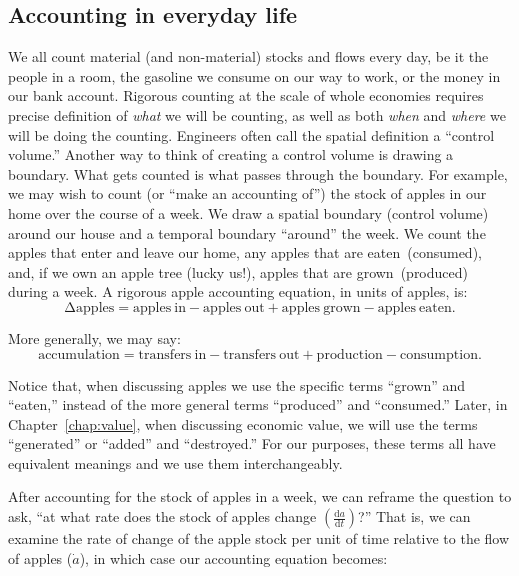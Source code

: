\subsection{Accounting in everyday life}
\label{sec:accounting_in_everyday_life}

We all count material (and non-material) stocks and flows every day,
be it the people in a room, the gasoline we consume on our way to work,
or the money in our bank account.
Rigorous counting at the scale of whole economies 
requires precise definition of
\emph{what} we will be counting,
as well as both \emph{when} and \emph{where} 
we will be doing the counting. 
Engineers often call the spatial definition a ``control volume.'' 
Another way to think of creating a
control volume is drawing a boundary. 
What gets counted is what passes through the boundary.
For example, 
we may wish to count (or ``make an accounting of'') 
the stock of apples in our home over the course of a week. 
We draw a spatial boundary (control volume) around our house 
and a temporal boundary ``around'' the week.
We count the apples that enter and leave our home, any
apples that are eaten~(consumed),
and, if we own an apple tree (lucky us!), 
apples that are grown~(produced) during a week. 
A rigorous apple accounting equation, in units of apples, is:
\begin{equation}
	\mathrm{\Delta}\mathrm{apples} 
	= \mathrm{apples~in} 
	- \mathrm{apples~out} 
	+ \mathrm{apples~grown} 
	- \mathrm{apples~eaten}.
\end{equation}

\noindent{}More generally, we may say:
\begin{equation}
	\mathrm{accumulation}
	= \mathrm{transfers~in} 
	- \mathrm{transfers~out}
	+ \mathrm{production}
	- \mathrm{consumption}.
\end{equation}

Notice that, when discussing apples we use the specific terms 
``grown'' and ``eaten,'' 
instead of the more general terms 
``produced'' and ``consumed.''
Later, in Chapter~\ref{chap:value}, when discussing economic value, 
we will use the terms
``generated'' or ``added'' and ``destroyed.'' 
For our purposes, these terms all have equivalent
meanings and we use them interchangeably.

After accounting for the stock of apples in a week,
we can reframe the question to ask,
``at what rate does the stock of apples change 
$\left( \frac{\mathrm{d}a}{\mathrm{d}t} \right)$?'' 
That is, we can examine the rate of
change of the apple stock per unit of time 
relative to the flow of apples ($\dot{a}$), 
in which case our accounting equation becomes:

